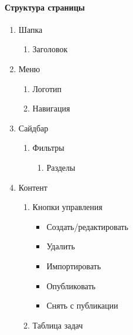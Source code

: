 \paragraph{Структура страницы}
\begin{enumerate}
    \item Шапка
    \begin{enumerate}
        \item Заголовок
    \end{enumerate}

    \item Меню
    \begin{enumerate}
        \item Логотип
        \item Навигация
    \end{enumerate}

    \item Сайдбар
    \begin{enumerate}
        \item Фильтры
        \begin{enumerate}
            \item Разделы
        \end{enumerate}
    \end{enumerate}

    \item Контент
    \begin{enumerate}
        \item Кнопки управления
        \begin{itemize}
            \item Создать/редактировать
            \item Удалить
            \item Импортировать
            \item Опубликовать
            \item Снять с публикации
        \end{itemize}
        \item Таблица задач
    \end{enumerate}
\end{enumerate}

